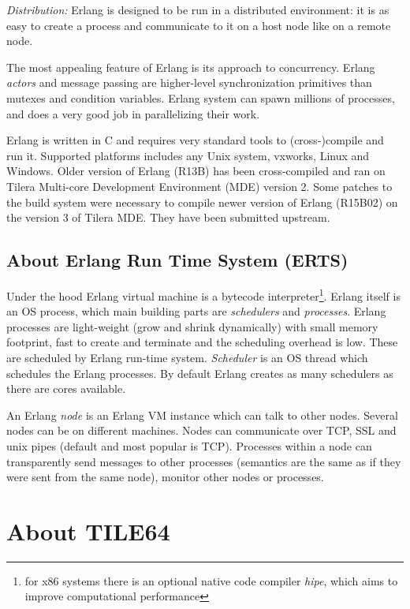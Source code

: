 \documentclass[english,11pt]{article}
\begin{document}
{\em Distribution:} Erlang is designed to be run in a distributed
environment: it is as easy to create a process and communicate to
it on a host node like on a remote node.

The most appealing feature of Erlang is its approach to concurrency. Erlang {\em
actors} and message passing are higher-level synchronization primitives than
mutexes and condition variables. Erlang system can spawn millions of processes,
and does a very good job in parallelizing their work.

Erlang is written in C and requires very standard tools to (cross-)compile and
run it. Supported platforms includes any Unix system, vxworks, Linux and
Windows. Older version of Erlang (R13B) has been cross-compiled and ran on
Tilera Multi-core Development Environment (MDE) version 2. Some patches to the
build system were necessary to compile newer version of Erlang (R15B02) on the
version 3 of Tilera MDE. They have been submitted upstream.

\subsection{About Erlang Run Time System (ERTS)}

Under the hood Erlang virtual machine is a bytecode interpreter\footnote{for x86
systems there is an optional native code compiler \emph{hipe}\cite{hipe}, which
aims to improve computational performance}. Erlang itself is an OS process,
which main building parts are {\em schedulers} and {\em processes}. Erlang
processes are light-weight (grow and shrink dynamically) with small memory
footprint, fast to create and terminate and the scheduling overhead is low.
These are scheduled by Erlang run-time system. {\em Scheduler} is an OS thread
which schedules the Erlang processes. By default Erlang creates as many
schedulers as there are cores available.

An Erlang {\em node} is an Erlang VM instance which can talk to other nodes.
Several nodes can be on different machines. Nodes can communicate over TCP, SSL
and unix pipes (default and most popular is TCP). Processes within a node can
transparently send messages to other processes (semantics are the same as if
they were sent from the same node), monitor other nodes or processes.

\section{About TILE64}
\label{sec:tilera}
\end{document}

